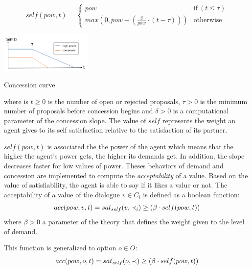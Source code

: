 \documentclass{llncs}
\begin{document}
		\begin{equation}
		self(pow, t) = \left\{\begin{array}{ll}
		pow & \mathrm{if\ } (t \leq \tau)\\
		max(0, pow - (\frac{\delta}{pow} \cdot (t - \tau))) & \mathrm{otherwise}
		\end{array}\right.
		\end{equation}
			\begin{floatingfigure}[r]{1.8in}
				\includegraphics[width=1.8in]{graphs/s3.png}
				\caption{\label{fig:conc}Concession curve}
			\end{floatingfigure} 
		where is $t \geq 0$ is the number of open or rejected proposals, $\tau > 0$ is the minimum number of proposals before concession begins and $\delta > 0$ is a computational parameter of the concession slope. The value of $self$ represents the weight an agent gives to its self satisfaction relative to the satisfaction of its partner.
			
		$self(pow, t)$ is associated the the power of the agent which means that the higher the agent's power gets, the higher its demands get. In addition, the slope decreases faster for low values of power. 
		Theses behaviors of demand and concession are implemented to compute the \textit{acceptability} of a value. Based on the value of satisfiability, the agent is able to say if it likes a value or not.
		The acceptability of a value of the dialogue $v \in C_i$ is defined as a boolean function:
		\vspace{-.5em} 
		\begin{equation}
		\vspace{-.5em} 
		acc(pow,v, t) = sat_{self}(v, \prec_i) \geq  (\beta \cdot self(pow,t))
		\end{equation}
		where $\beta>0$ a parameter of the theory that defines the weight given to the level of demand.
		
		This function is generalized to option $o \in O$:
		\vspace{-.5em} 
		\begin{equation}
		acc(pow,o, t) = sat_{self}(o, \prec) \geq  (\beta \cdot self(pow,t))
		\vspace{-1.5em} 
		\end{equation}
		
\end{document}
